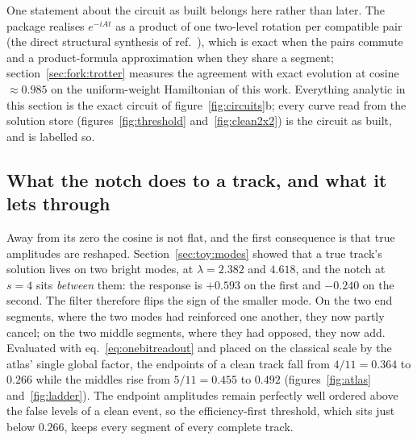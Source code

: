 \documentclass[11pt,a4paper]{article}
\begin{document}
One statement about the circuit as built belongs here rather than later.
The package realises $e^{-iAt}$ as a product of one two-level rotation per
compatible pair (the direct structural synthesis of ref.~\cite{trackhhl}),
which is exact when the pairs commute and a product-formula approximation
when they share a segment; section~\ref{sec:fork:trotter} measures the
agreement with exact evolution at cosine $\approx0.985$ on the uniform-weight
Hamiltonian of this work. Everything analytic in this section is the exact
circuit of figure~\ref{fig:circuits}b; every curve read from the solution
store (figures~\ref{fig:threshold} and~\ref{fig:clean2x2}) is the circuit as
built, and is labelled so.


\subsection{What the notch does to a track, and what it lets through}
\label{sec:onebit:track}

Away from its zero the cosine is not flat, and the first consequence is
that true amplitudes are reshaped. Section~\ref{sec:toy:modes} showed that
a true track's solution lives on two bright modes, at $\lambda=2.382$ and
$4.618$, and the notch at $s=4$ sits \emph{between} them: the response is
$+0.593$ on the first and $-0.240$ on the second. The filter therefore
flips the sign of the smaller mode. On the two end segments, where the two
modes had reinforced one another, they now partly cancel; on the two middle
segments, where they had opposed, they now add. Evaluated with
eq.~\eqref{eq:onebitreadout} and placed on the classical scale by the atlas'
single global factor, the endpoints of a clean track fall from $4/11=0.364$
to $0.266$ while the middles rise from $5/11=0.455$ to $0.492$
(figures~\ref{fig:atlas} and~\ref{fig:ladder}). The endpoint amplitudes
remain perfectly well ordered above the false levels of a clean event, so
the efficiency-first threshold, which sits just below $0.266$, keeps every
segment of every complete track.
\end{document}
